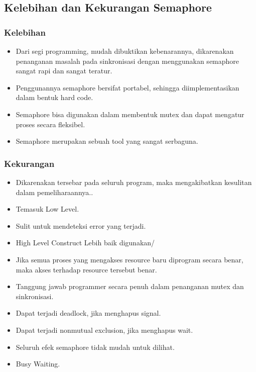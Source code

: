 	\subsection{Kelebihan dan Kekurangan Semaphore}
		\subsubsection{Kelebihan}
			\begin{itemize}
				\item Dari segi programming, mudah dibuktikan kebenarannya, dikarenakan penanganan masalah pada sinkronisasi dengan menggunakan semaphore sangat rapi dan sangat teratur.
				\item Penggunannya semaphore bersifat portabel, sehingga diimplementasikan dalam bentuk hard code.
				\item Semaphore bisa digunakan dalam membentuk mutex dan dapat mengatur proses secara fleksibel.
				\item Semaphore merupakan sebuah tool yang sangat serbaguna.
			\end{itemize}
		
		\subsubsection{Kekurangan}
			\begin{itemize}
				\item Dikarenakan tersebar pada seluruh program, maka mengakibatkan kesulitan dalam pemeliharaannya..
				\item Temasuk Low Level.
				\item Sulit untuk mendeteksi error yang terjadi.
				\item High Level Construct Lebih baik digunakan/
				\item Jika semua proses yang mengakses resource baru diprogram secara benar, maka akses terhadap resource tersebut benar.
				\item Tanggung jawab programmer secara penuh dalam penanganan mutex dan sinkronisasi.
				\item Dapat terjadi deadlock, jika menghapus signal.
				\item Dapat terjadi nonmutual exclusion, jika menghapus wait.
				\item Seluruh efek semaphore tidak mudah untuk dilihat.
				\item Busy Waiting.
			\end{itemize}